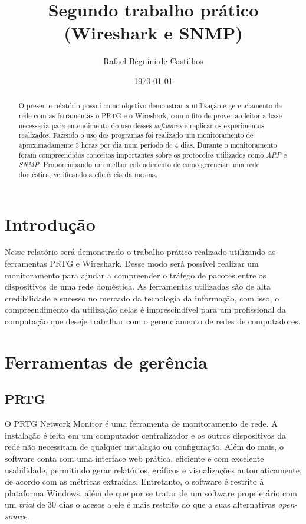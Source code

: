 \documentclass[12pt]{article}
\author{Rafael Begnini de Castilhos}
\title{Segundo trabalho prático (Wireshark e SNMP)}
\date{\today}
\begin{document}
\maketitle

\begin{abstract}
O presente relatório possui como objetivo demonstrar a utilização e gerenciamento de rede com as ferramentas o PRTG e o Wireshark, com o fito de prover ao leitor a base necessária para entendimento  do uso desses \emph{softwares} e replicar os experimentos realizados. Fazendo o uso dos programas foi realizado um monitoramento de aproximadamente 3 horas por dia num período de 4 dias. Durante o monitoramento foram compreendidos conceitos importantes sobre os protocolos utilizados como \emph{ARP} e \emph{SNMP}. Proporcionando um melhor entendimento de como gerenciar uma rede doméstica, verificando a eficiência da mesma.
\end{abstract}

\tableofcontents

\section{Introdução}

Nesse relatório será demonstrado o trabalho prático realizado utilizando as ferramentas PRTG e Wireshark. Desse modo será possível realizar um monitoramento para ajudar a compreender o tráfego de pacotes entre os dispositivos de uma rede doméstica. As ferramentas utilizadas são de alta credibilidade e sucesso no mercado da tecnologia da informação, com isso, o compreendimento da utilização delas é imprescindível para um profissional da computação que deseje trabalhar com o gerenciamento de redes de computadores.

\section{Ferramentas de gerência}

\subsection{PRTG}

O PRTG Network Monitor é uma ferramenta de monitoramento de rede. A instalação é feita em um computador centralizador e os outros dispositivos da rede não necessitam de qualquer instalação ou configuração. Além do mais, o software conta com uma interface web prática, eficiente e com excelente usabilidade, permitindo gerar relatórios, gráficos e visualizações automaticamente, de acordo com as métricas extraídas. Entretanto, o software é restrito à plataforma Windows, além de que por se tratar de um software proprietário com um \emph{trial} de 30 dias o acesos a ele é mais restrito do que a suas alternativas \emph{open-source}.
\end{document}
